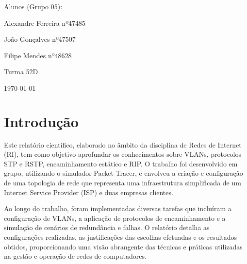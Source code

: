 \documentclass[11pt,english, openright, oneside]{book}
\begin{document}
\begin{titlepage}
\begin{center}
{        \vspace{0.5cm}
              
        Alunos (Grupo 05):
        \par
        Alexandre Ferreira nº47485 
        \par 
        João Gonçalves nº47507
        \par
        Filipe Mendes nº48628
        
        \vspace{0.5cm} 
        Turma 52D
                
        \vspace{1cm}
        {\normalsize \today \par}
	             
	             
	             
	             \par}
	\end{center}
		
	
	
	\pagebreak

\end{titlepage}

\tableofcontents
\pagebreak
\newpage


\begingroup
\let\clearpage\relax
\pagebreak
\listoffigures
\endgroup

\newpage

\begingroup
\let\clearpage\relax
\pagebreak
\listoftables
\endgroup

\newpage

\mainmatter
\chapter{Introdução}
Este relatório científico, elaborado no âmbito da disciplina de Redes de
Internet (RI), tem como objetivo aprofundar os conhecimentos sobre VLANs,
protocolos STP e RSTP, encaminhamento estático e RIP. O trabalho foi
desenvolvido em grupo, utilizando o simulador Packet Tracer, e envolveu a
criação e configuração de uma topologia de rede que representa uma
infraestrutura simplificada de um Internet Service Provider (ISP) e duas
empresas clientes. \par \vspace{0.2cm}

Ao longo do trabalho, foram implementadas diversas tarefas que incluíram a
configuração de VLANs, a aplicação de protocolos de encaminhamento e a simulação
de cenários de redundância e falhas. O relatório detalha as configurações
realizadas, as justificações das escolhas efetuadas e os resultados obtidos,
proporcionando uma visão abrangente das técnicas e práticas utilizadas na gestão
e operação de redes de computadores. \par \vspace{0.2cm}
\end{document}
